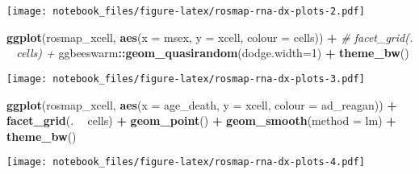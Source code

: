 \documentclass[]{book}
\newenvironment{Shaded}{\begin{snugshade}}{\end{snugshade}}
\newcommand{\CommentTok}[1]{\textcolor[rgb]{0.56,0.35,0.01}{\textit{#1}}}
\newcommand{\DataTypeTok}[1]{\textcolor[rgb]{0.13,0.29,0.53}{#1}}
\newcommand{\DecValTok}[1]{\textcolor[rgb]{0.00,0.00,0.81}{#1}}
\newcommand{\KeywordTok}[1]{\textcolor[rgb]{0.13,0.29,0.53}{\textbf{#1}}}
\newcommand{\NormalTok}[1]{#1}
\newcommand{\OperatorTok}[1]{\textcolor[rgb]{0.81,0.36,0.00}{\textbf{#1}}}
\newcommand{\StringTok}[1]{\textcolor[rgb]{0.31,0.60,0.02}{#1}}
\begin{document}
\texttt{[image: notebook\_files/figure-latex/rosmap-rna-dx-plots-2.pdf]}

\begin{Shaded}
\begin{Highlighting}[]
\KeywordTok{ggplot}\NormalTok{(rosmap_xcell, }\KeywordTok{aes}\NormalTok{(}\DataTypeTok{x =}\NormalTok{ msex, }\DataTypeTok{y =}\NormalTok{ xcell, }\DataTypeTok{colour =}\NormalTok{ cells)) }\OperatorTok{+}\StringTok{ }
\StringTok{  }\CommentTok{# facet_grid(. ~ cells) + }
\StringTok{  }\NormalTok{ggbeeswarm}\OperatorTok{::}\KeywordTok{geom_quasirandom}\NormalTok{(}\DataTypeTok{dodge.width=}\DecValTok{1}\NormalTok{) }\OperatorTok{+}\StringTok{ }
\StringTok{  }\KeywordTok{theme_bw}\NormalTok{()}
\end{Highlighting}
\end{Shaded}

\texttt{[image: notebook\_files/figure-latex/rosmap-rna-dx-plots-3.pdf]}

\begin{Shaded}
\begin{Highlighting}[]
\KeywordTok{ggplot}\NormalTok{(rosmap_xcell, }\KeywordTok{aes}\NormalTok{(}\DataTypeTok{x =}\NormalTok{ age_death, }\DataTypeTok{y =}\NormalTok{ xcell, }\DataTypeTok{colour =}\NormalTok{ ad_reagan)) }\OperatorTok{+}\StringTok{ }
\StringTok{  }\KeywordTok{facet_grid}\NormalTok{(. }\OperatorTok{~}\StringTok{ }\NormalTok{cells) }\OperatorTok{+}
\StringTok{  }\KeywordTok{geom_point}\NormalTok{() }\OperatorTok{+}\StringTok{ }
\StringTok{  }\KeywordTok{geom_smooth}\NormalTok{(}\DataTypeTok{method =}\NormalTok{ lm) }\OperatorTok{+}\StringTok{ }
\StringTok{  }\KeywordTok{theme_bw}\NormalTok{()}
\end{Highlighting}
\end{Shaded}

\texttt{[image: notebook\_files/figure-latex/rosmap-rna-dx-plots-4.pdf]}

\begin{Shaded}
\end{Shaded}
\end{document}
